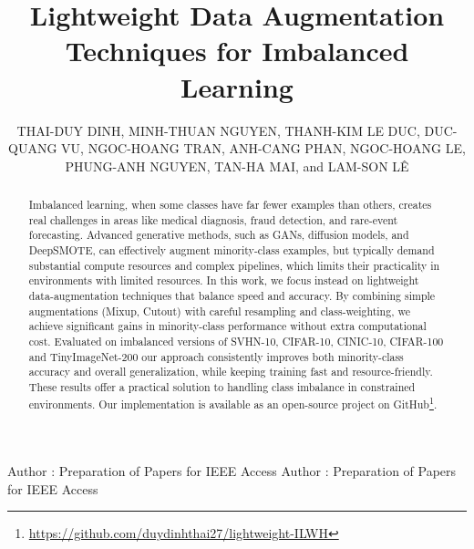 \documentclass{ieeeaccess}
\begin{document}

\title{Lightweight Data Augmentation Techniques for Imbalanced Learning}

\author{\uppercase{Thai-Duy Dinh},
\uppercase{Minh-Thuan Nguyen}, 
\uppercase{Thanh-Kim Le Duc},
\uppercase{Duc-Quang Vu},
\uppercase{Ngoc-Hoang Tran},
\uppercase{Anh-Cang Phan},
\uppercase{Ngoc-Hoang Le},
\uppercase{Phung-Anh Nguyen},
\uppercase{Tan-Ha Mai},
and \uppercase{Lam-Son L\^{e}} }

\address[1]{Faculty of Engineering, Vietnamese-German University, Ho Chi Minh City 75911, Vietnam}
\address[2]{Faculty of Information Technology, Thai Nguyen University of Information and Communication Technology, Vietnam}
\address[3]{Department of Software Engineering, FPT University, Can Tho, Vietnam}
\address[4]{Vinh Long University of Technology Education, Vinh Long, Vietnam}
\address[5]{Department of Computer Science and Information Engineering, National Taiwan University, Taipei, Taiwan}
\address[6]{Graduate Institute of Data Science, Taipei Medical University, Taipei, Taiwan}
\address[7]{Graduate Institute of Biomedical Materials and Tissue Engineering, Taipei Medical University, Taipei, Taiwan}

\markboth
{Author \headeretal: Preparation of Papers for IEEE Access}
{Author \headeretal: Preparation of Papers for IEEE Access}



\begin{abstract}
Imbalanced learning, when some classes have far fewer examples than others, creates real challenges in areas like medical diagnosis, fraud detection, and rare-event forecasting. Advanced generative methods, such as GANs, diffusion models, and DeepSMOTE, can effectively augment minority-class examples, but typically demand substantial compute resources and complex pipelines, which limits their practicality in environments with limited resources. In this work, we focus instead on lightweight data-augmentation techniques that balance speed and accuracy. By combining simple augmentations (Mixup, Cutout) with careful resampling and class-weighting, we achieve significant gains in minority-class performance without extra computational cost. Evaluated on imbalanced versions of SVHN-10, CIFAR-10, CINIC-10, CIFAR-100 and TinyImageNet-200 our approach consistently improves both minority-class accuracy and overall generalization, while keeping training fast and resource-friendly. These results offer a practical solution to handling class imbalance in constrained environments. Our implementation is available as an open-source project on GitHub\footnote{\url{https://github.com/duydinhthai27/lightweight-ILWH}}.

\end{abstract}
\end{document}
